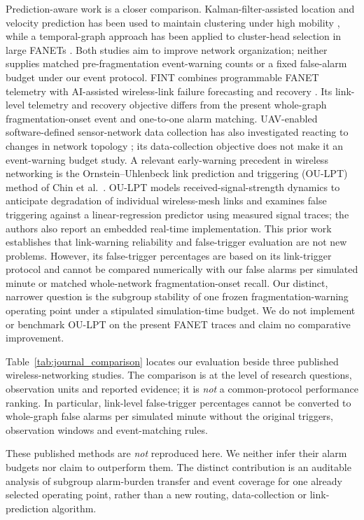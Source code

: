 \documentclass[10pt,a4paper]{article}
\begin{document}
Prediction-aware work is a closer comparison. Kalman-filter-assisted location and velocity prediction has been used to maintain clustering under high mobility \cite{zhang2023location}, while a temporal-graph approach has been applied to cluster-head selection in large FANETs \cite{fan2026tgn}. Both studies aim to improve network organization; neither supplies matched pre-fragmentation event-warning counts or a fixed false-alarm budget under our event protocol. FINT combines programmable FANET telemetry with AI-assisted wireless-link failure forecasting and recovery \cite{ismail2024fint}. Its link-level telemetry and recovery objective differs from the present whole-graph fragmentation-onset event and one-to-one alarm matching. UAV-enabled software-defined sensor-network data collection has also investigated reacting to changes in network topology \cite{karegar2025uav}; its data-collection objective does not make it an event-warning budget study. A relevant early-warning precedent in wireless networking is the Ornstein--Uhlenbeck link prediction and triggering (OU-LPT) method of Chin et al.\ \cite{chin2014oulpt}. OU-LPT models received-signal-strength dynamics to anticipate degradation of individual wireless-mesh links and examines false triggering against a linear-regression predictor using measured signal traces; the authors also report an embedded real-time implementation. This prior work establishes that link-warning reliability and false-trigger evaluation are not new problems. However, its false-trigger percentages are based on its link-trigger protocol and cannot be compared numerically with our false alarms per simulated minute or matched whole-network fragmentation-onset recall. Our distinct, narrower question is the subgroup stability of one frozen fragmentation-warning operating point under a stipulated simulation-time budget. We do not implement or benchmark OU-LPT on the present FANET traces and claim no comparative improvement.\par

Table~\ref{tab:journal_comparison} locates our evaluation beside three published wireless-networking studies. The comparison is at the level of research questions, observation units and reported evidence; it is \emph{not} a common-protocol performance ranking. In particular, link-level false-trigger percentages cannot be converted to whole-graph false alarms per simulated minute without the original triggers, observation windows and event-matching rules.

These published methods are \emph{not} reproduced here. We neither infer their alarm budgets nor claim to outperform them. The distinct contribution is an auditable analysis of subgroup alarm-burden transfer and event coverage for one already selected operating point, rather than a new routing, data-collection or link-prediction algorithm.
\end{document}
